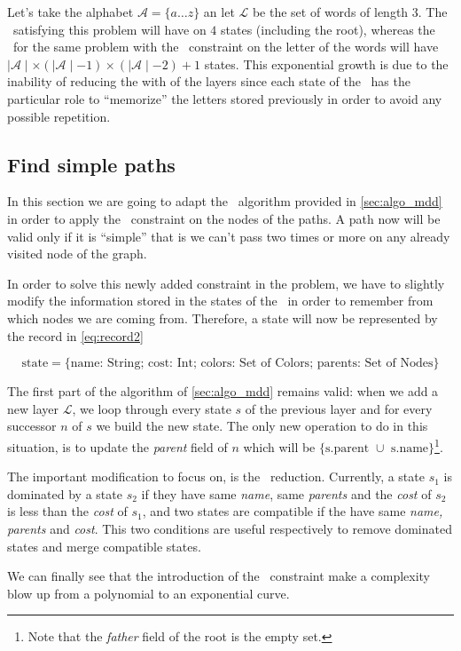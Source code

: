 Let's take the alphabet $\mathcal{A} = \{a \dots z\}$ an let $\mathcal{L}$ be the set of words of length $3$. The \mdd\ satisfying this problem will have on $4$ states (including the root), whereas the \mdd\ for the same problem with the \alldiff\ constraint on the letter of the words will have $\mid \mathcal{A} \mid \times (\mid \mathcal{A} \mid - 1) \times (\mid \mathcal{A} \mid - 2) + 1$ states. This exponential growth is due to the inability of reducing the with of the layers since each state of the \mdd\ has the particular role to ``memorize'' the letters stored previously in order to avoid any possible repetition.

\subsection{Find simple paths}

In this section we are going to adapt the \mdd\ algorithm provided in \cref{sec:algo_mdd} in order to apply the \alldiff\ constraint on the nodes of the paths. A path now will be valid only if it is ``simple'' that is we can't pass two times or more on any already visited node of the graph.

In order to solve this newly added constraint in the problem, we have to slightly modify the information stored in the states of the \mdd\ in order to remember from which nodes we are coming from. Therefore, a state will now be represented by the record in \cref{eq:record2}

\begin{equation}
  \label{eq:record2}
  \text{state} = \{\text{name: String; cost: Int; colors: Set of Colors; parents: Set of Nodes}\}
\end{equation}

The first part of the algorithm of \cref{sec:algo_mdd} remains valid: when we add a new layer $\mathcal{L}$, we loop through every state $s$ of the previous layer and for every successor $n$ of $s$ we build the new state. The only new operation to do in this situation, is to update the \textit{parent} field of $n$ which will be $\{\text{s.parent } \cup \text{ s.name}\}$\footnote{Note that the \textit{father} field of the root is the empty set.}.

The important modification to focus on, is the \mdd\ reduction. Currently, a state $s_1$ is dominated by a state $s_2$ if they have same \textit{name}, same \textit{parents} and the \textit{cost} of $s_2$ is less than the \textit{cost} of $s_1$, and two states are compatible if the have same \textit{name, parents} and \textit{cost}. This two conditions are useful respectively to remove dominated states and merge compatible states.

We can finally see that the introduction of the \alldiff\ constraint make a complexity blow up from a polynomial to an exponential curve.

